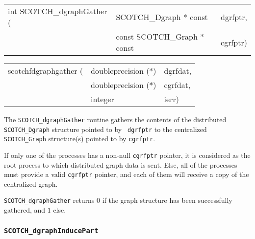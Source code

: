 \begin{itemize}
\progsyn

{\tt\begin{tabular}{l@{}ll}
int SCOTCH\_dgraphGather ( & SCOTCH\_Dgraph * const      & dgrfptr, \\
                           & const SCOTCH\_Graph * const & cgrfptr)
\end{tabular}}

{\tt\begin{tabular}{l@{}ll}
scotchfdgraphgather ( & doubleprecision (*) & dgrfdat, \\
                      & doubleprecision (*) & cgrfdat, \\
                      & integer             & ierr)
\end{tabular}}

\progdes

The {\tt SCOTCH\_dgraphGather} routine gathers the contents of the
distributed {\tt SCOTCH\_\lbt Dgraph} structure pointed to by {\tt
dgrfptr} to the centralized {\tt SCOTCH\_\lbt Graph} structure(s)
pointed to by {\tt cgrfptr}.

If only one of the processes has a non-null {\tt cgrfptr}
pointer, it is considered as the root process to which distributed
graph data is sent. Else, all of the processes must provide a valid
{\tt cgrfptr} pointer, and each of them will receive a copy of
the centralized graph.

\progret

{\tt SCOTCH\_dgraphGather} returns $0$ if the graph structure has
been successfully gathered, and $1$ else.
\end{itemize}

\subsubsection{{\tt SCOTCH\_dgraphInducePart}}

